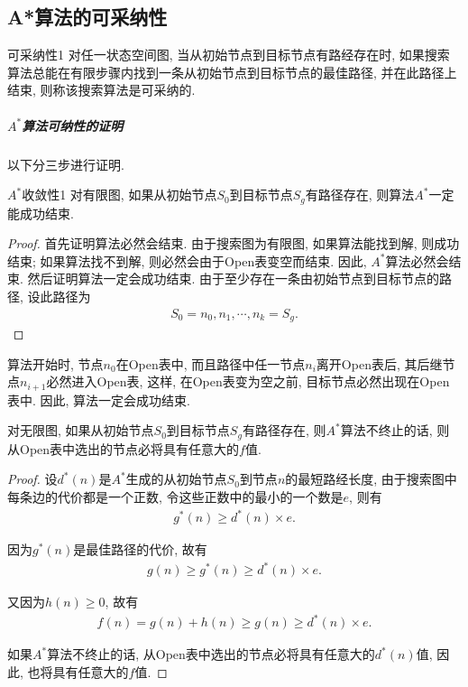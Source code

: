 \subsection{A*算法的可采纳性}
\begin{mydef}{可采纳性}{1}
    对任一状态空间图, 当从初始节点到目标节点有路经存在时, 如果搜索算法总能在有限步骤内找到一条从初始节点到目标节点的最佳路径, 并在此路径上结束, 则称该搜索算法是可采纳的.
\end{mydef}
\subparagraph{$A^*$算法可纳性的证明}
以下分三步进行证明.
\begin{mythm}{$A^*$收敛性}{1}\label{Thm401}
    对有限图, 如果从初始节点$S_0$到目标节点$S_g$有路径存在, 则算法$A^*$一定能成功结束.
\end{mythm}
\begin{proof}
    首先证明算法必然会结束. 由于搜索图为有限图, 如果算法能找到解, 则成功结束; 如果算法找不到解, 则必然会由于Open表变空而结束. 因此, $A^*$算法必然会结束.
然后证明算法一定会成功结束. 由于至少存在一条由初始节点到目标节点的路径, 设此路径为
\begin{align}
    S_0=n_0, n_1, \cdots, n_k=S_g.
\end{align}
\end{proof}
算法开始时, 节点$n_0$在Open表中, 而且路径中任一节点$n_i$离开Open表后, 其后继节点$n_{i+1}$必然进入Open表, 这样, 在Open表变为空之前, 目标节点必然出现在Open表中. 因此, 算法一定会成功结束.
\begin{mylem}{}{}\label{AIlem001}
    对无限图, 如果从初始节点$S_0$到目标节点$S_g$有路径存在, 则$A^*$算法不终止的话, 则从Open表中选出的节点必将具有任意大的$f$值.
\end{mylem}
\begin{proof}
    设$d^*(n)$是$A^*$生成的从初始节点$S_0$到节点$n$的最短路经长度, 由于搜索图中每条边的代价都是一个正数, 令这些正数中的最小的一个数是$e$, 则有
\begin{align}
    g^*(n)\geq d^*(n)\times e.
\end{align}

因为$g^*(n)$是最佳路径的代价, 故有
\begin{align}
    g(n)\geq g^*(n)\geq d^*(n)\times e.
\end{align}

又因为$h(n)\geq 0$, 故有
\begin{align}
    f(n)=g(n)+h(n)\geq g(n)\geq d^*(n)\times e.
\end{align}

如果$A^*$算法不终止的话, 从Open表中选出的节点必将具有任意大的$d^*(n)$值, 因此, 也将具有任意大的$f$值.
\end{proof}
